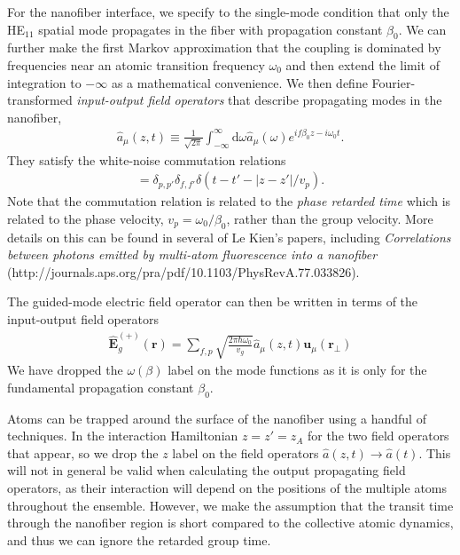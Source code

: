 \documentclass[]{report}
\begin{document}
For the nanofiber interface, we specify to the single-mode condition that only the HE$_{11}$ spatial mode propagates in the fiber with propagation constant $\beta_0$.  We can further make the first Markov approximation that the coupling is dominated by frequencies near an atomic transition frequency $\omega_0$ and then extend the limit of integration to $-\infty$ as a mathematical convenience.  We then define Fourier-transformed \emph{input-output field operators} that describe propagating modes in the nanofiber,
	\begin{align}
		\hat{a}_{\mu}(z,t) \equiv \frac{1}{\sqrt{2\pi}} \int_{-\infty}^{\infty} \mathrm{d}\omega \hat{a}_{\mu}(\omega) e^{i f \beta_0 z -i\omega_0 t}.
	\end{align}	
They satisfy the white-noise commutation relations
	\begin{align}
		[\hat{a}_{\mu}(z,t), \hat{a}\dg_{\mu'}(z',t')] = \delta_{p,p'} \delta_{f,f'} \delta(t-t' - |z-z'|/v_p).
	\end{align}	
Note that the commutation relation is related to the \emph{phase retarded time} which is related to the phase velocity, $v_p = \omega_0/\beta_0$, rather than the group velocity.  More details on this can be found in several of Le Kien's papers, including \emph{Correlations between photons emitted by multi-atom fluorescence into a nanofiber} (http://journals.aps.org/pra/pdf/10.1103/PhysRevA.77.033826).

The guided-mode electric field operator can then be written in terms of the input-output field operators
	\begin{align}
		\hat{\mathbf{E}}_g^{(+)}(\mathbf{r}) = \sum_{f ,p} \sqrt{\frac{2 \pi \hbar \omega_0}{v_g}} \hat{a}_{\mu}(z,t) \mathbf{u}_{\mu}(\mathbf{r}_\perp) 
	\end{align}
We have dropped the $\omega(\beta)$ label on the mode functions as it is only for the fundamental propagation constant $\beta_0$.

Atoms can be trapped around the surface of the nanofiber using a handful of techniques.  In the interaction Hamiltonian $z=z' =z_A$ for the two field operators that appear, so we drop the $z$ label on the field operators $\hat{a}(z,t) \rightarrow \hat{a}(t)$.  This will not in general be valid when calculating the output propagating field operators, as their interaction will depend on the positions of the multiple atoms throughout the ensemble.  However, we make the assumption that the transit time through the nanofiber region is short compared to the collective atomic dynamics, and thus we can ignore the retarded group time.  
\end{document}
